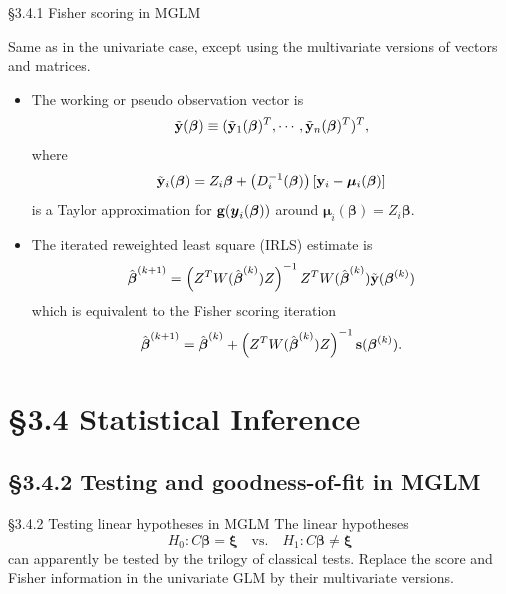\documentclass{beamer}
\newcommand{\currentsection}{}
\let\oldsection\section
\renewcommand{\section}[1]{\oldsection{#1}\renewcommand{\currentsection}{#1}}
\newcommand{\currentsubsection}{}
\let\oldsubsection\subsection
\renewcommand{\subsection}[1]{\oldsubsection{#1}\renewcommand{\currentsubsection}{#1}}
\newcommand{\boldbeta}{{\boldsymbol \beta}}
\newcommand{\boldmu}{{\boldsymbol \mu}}
\newcommand{\boldxi}{{\boldsymbol \xi}}
\newenvironment{wideitemize}%
  {\begin{itemize}%
    \setlength{\parskip}{1em}}%
  {\end{itemize}}
\begin{document}
%

\begin{frame}{\S3.4.1 Fisher scoring in MGLM}

Same as in the univariate case, except using the multivariate versions of vectors and matrices.
\begin{wideitemize}
\item
The working or pseudo observation vector is
\[
\tilde{\bf y}(\boldbeta) \equiv (\tilde{\bf y}_1(\boldbeta)^T,
\cdots, \tilde{\bf y}_n(\boldbeta)^T)^T,
\]
where
\[
 \tilde{\bf y}_i(\boldbeta)= Z_i\boldbeta+
\left(D_i^{-1}(\boldbeta)\right)[{\bf y}_i-\boldmu_i(\boldbeta)]
\]
is a Taylor approximation for $\textbf{g}(\mbox{\boldmath $y$}_i(\mbox{\boldmath $\beta$}))$ around $\boldmu_i(\boldbeta) = Z_i \boldbeta$.
\item
The iterated reweighted least square (IRLS) estimate is
$$\hat{\mbox{\boldmath $\beta$}}^{(k+1)}=\left(Z^TW(\hat{\mbox{\boldmath $\beta$}}^{(k)})Z\right)^{-1}
Z^TW(\hat{\mbox{\boldmath $\beta$}}^{(k)})\tilde{\textbf{y}}(\mbox{\boldmath $\beta$}^{(k)})$$
which is equivalent to the Fisher scoring iteration
$$\hat{\mbox{\boldmath $\beta$}}^{(k+1)}=\hat{\mbox{\boldmath $\beta$}}^{(k)}+
\left(Z^TW(\hat{\mbox{\boldmath $\beta$}}^{(k)})Z\right)^{-1}\textbf{s}(\mbox{\boldmath $\beta$}^{(k)}).$$
\end{wideitemize}

\end{frame}



\section{\S3.4 Statistical Inference} \label{sec:3.4}

\subsection{\S3.4.2 Testing and goodness-of-fit in MGLM}\label{sec:3.4.2}
\begin{frame}{\S3.4.2 Testing linear hypotheses in MGLM}
The linear hypotheses
\[
H_0: C\boldbeta=\boldxi\quad \mbox{vs.}\quad
H_1: C \boldbeta\neq\boldxi
\]
can apparently be tested by the trilogy of classical tests. Replace the score and
Fisher information in the univariate GLM  by their multivariate versions.
\end{frame}
\end{document}
